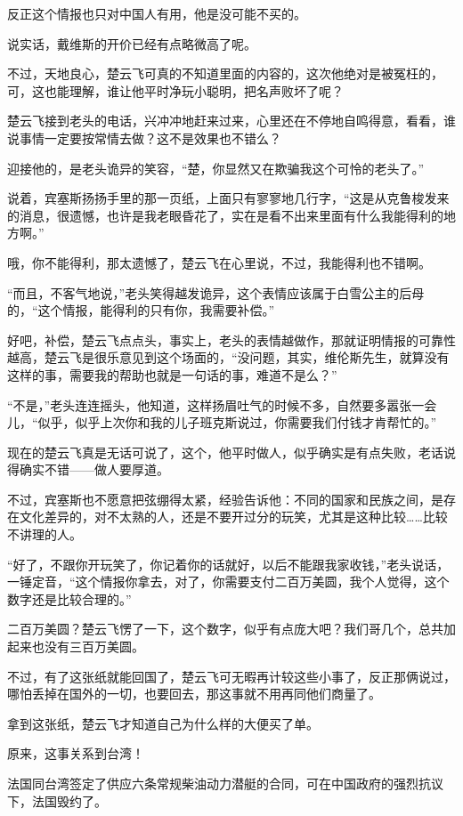 反正这个情报也只对中国人有用，他是没可能不买的。

说实话，戴维斯的开价已经有点略微高了呢。

不过，天地良心，楚云飞可真的不知道里面的内容的，这次他绝对是被冤枉的，可，这也能理解，谁让他平时净玩小聪明，把名声败坏了呢？

楚云飞接到老头的电话，兴冲冲地赶来过来，心里还在不停地自鸣得意，看看，谁说事情一定要按常情去做？这不是效果也不错么？

迎接他的，是老头诡异的笑容，“楚，你显然又在欺骗我这个可怜的老头了。”

说着，宾塞斯扬扬手里的那一页纸，上面只有寥寥地几行字，“这是从克鲁梭发来的消息，很遗憾，也许是我老眼昏花了，实在是看不出来里面有什么我能得利的地方啊。”

哦，你不能得利，那太遗憾了，楚云飞在心里说，不过，我能得利也不错啊。

“而且，不客气地说，”老头笑得越发诡异，这个表情应该属于白雪公主的后母的，“这个情报，能得利的只有你，我需要补偿。”

好吧，补偿，楚云飞点点头，事实上，老头的表情越做作，那就证明情报的可靠性越高，楚云飞是很乐意见到这个场面的，“没问题，其实，维伦斯先生，就算没有这样的事，需要我的帮助也就是一句话的事，难道不是么？”

“不是，”老头连连摇头，他知道，这样扬眉吐气的时候不多，自然要多嚣张一会儿，“似乎，似乎上次你和我的儿子班克斯说过，你需要我们付钱才肯帮忙的。”

现在的楚云飞真是无话可说了，这个，他平时做人，似乎确实是有点失败，老话说得确实不错——做人要厚道。

不过，宾塞斯也不愿意把弦绷得太紧，经验告诉他：不同的国家和民族之间，是存在文化差异的，对不太熟的人，还是不要开过分的玩笑，尤其是这种比较……比较不讲理的人。

“好了，不跟你开玩笑了，你记着你的话就好，以后不能跟我家收钱，”老头说话，一锤定音，“这个情报你拿去，对了，你需要支付二百万美圆，我个人觉得，这个数字还是比较合理的。”

二百万美圆？楚云飞愣了一下，这个数字，似乎有点庞大吧？我们哥几个，总共加起来也没有三百万美圆。

不过，有了这张纸就能回国了，楚云飞可无暇再计较这些小事了，反正那俩说过，哪怕丢掉在国外的一切，也要回去，那这事就不用再同他们商量了。

拿到这张纸，楚云飞才知道自己为什么样的大便买了单。

原来，这事关系到台湾！

法国同台湾签定了供应六条常规柴油动力潜艇的合同，可在中国政府的强烈抗议下，法国毁约了。

